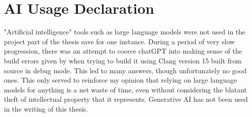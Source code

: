 \section*{AI Usage Declaration}
"Artificial intelligence" tools such as large language models were not used in the project part of the thesis save for one instance. During a period of very slow progression, there was an attempt to coerce chatGPT into making sense of the build errors given by \taffo{} when trying to build it using Clang version 15 built from source in debug mode. This led to many answers, though unfortunately no good ones. This only served to reinforce my opinion that relying on large language models for anything is a net waste of time, even without considering the blatant theft of intellectual property that it represents. Generative AI has not been used in the writing of this thesis. 

